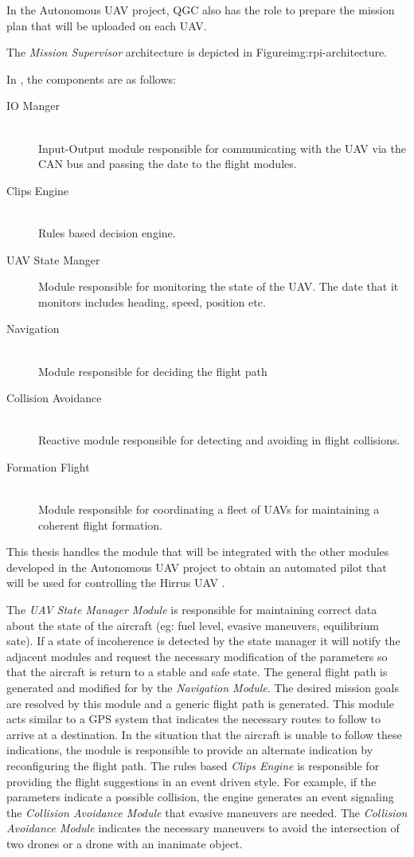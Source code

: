 In the Autonomous UAV project, QGC also has the role to prepare the mission plan
that will be uploaded on each UAV.

The \textit {Mission Supervisor} architecture is depicted in  
{Figure}{img:rpi-architecture}.

\newpage
In , the components are as
follows:
\begin{description}
\item [IO Manger] \hfill \\
Input-Output module responsible for communicating with the UAV via the CAN bus 
and passing the date to the flight modules.
\item [Clips Engine] \hfill \\
Rules based decision engine.
\item [UAV State Manger] Module responsible for monitoring the state of the UAV.
The date that it monitors includes heading, speed,  position etc.
\item [Navigation] \hfill \\
Module responsible for deciding the flight path
\item [Collision Avoidance] \hfill \\
Reactive module responsible for detecting and avoiding in flight collisions.
\item [Formation Flight] \hfill \\
Module responsible for coordinating a fleet of UAVs for maintaining a coherent
flight formation.
\end{description}

This thesis handles the \project module that will be integrated with the other
modules developed in the Autonomous UAV project to obtain an automated pilot
that will be used for controlling the Hirrus UAV \cite{hirrus}.

The \textit{UAV State Manager Module} is responsible for maintaining correct
data about the state of the aircraft (eg: fuel level, evasive maneuvers, equilibrium
sate). If a state of incoherence is detected by the state manager it will notify
the adjacent modules and request the necessary modification of the parameters
so that the aircraft is return to a stable and safe state. The general flight
path is generated and modified for by the \textit{Navigation Module}. The desired
mission goals are resolved by this module and a generic flight path is generated.
This module acts similar to a GPS system that indicates the necessary routes 
to follow to arrive at a destination. In the situation that the aircraft is 
unable to follow these indications, the module is responsible to provide
an alternate indication by reconfiguring the flight path. The 
rules based \textit{Clips Engine} is responsible for providing the flight 
suggestions in an event driven style. For example, if the parameters indicate
a possible collision, the engine generates an event signaling the \textit{
  Collision Avoidance Module} that evasive maneuvers are needed. The \textit{
Collision Avoidance Module} indicates the necessary maneuvers to avoid the
intersection of two drones or a drone with an inanimate object. 

